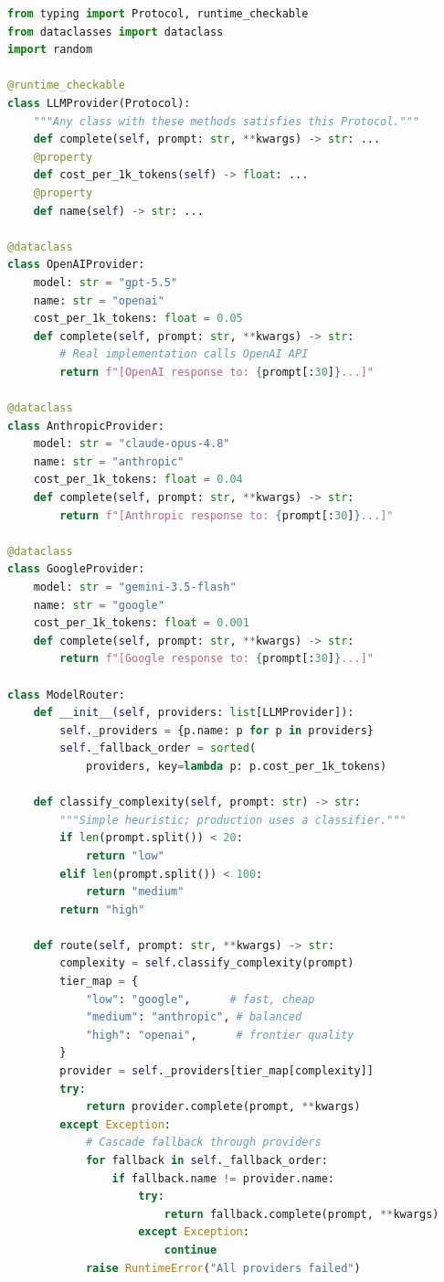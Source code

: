 \begin{lstlisting}[language=Python]
from typing import Protocol, runtime_checkable
from dataclasses import dataclass
import random

@runtime_checkable
class LLMProvider(Protocol):
    """Any class with these methods satisfies this Protocol."""
    def complete(self, prompt: str, **kwargs) -> str: ...
    @property
    def cost_per_1k_tokens(self) -> float: ...
    @property
    def name(self) -> str: ...

@dataclass
class OpenAIProvider:
    model: str = "gpt-5.5"
    name: str = "openai"
    cost_per_1k_tokens: float = 0.05
    def complete(self, prompt: str, **kwargs) -> str:
        # Real implementation calls OpenAI API
        return f"[OpenAI response to: {prompt[:30]}...]"

@dataclass
class AnthropicProvider:
    model: str = "claude-opus-4.8"
    name: str = "anthropic"
    cost_per_1k_tokens: float = 0.04
    def complete(self, prompt: str, **kwargs) -> str:
        return f"[Anthropic response to: {prompt[:30]}...]"

@dataclass
class GoogleProvider:
    model: str = "gemini-3.5-flash"
    name: str = "google"
    cost_per_1k_tokens: float = 0.001
    def complete(self, prompt: str, **kwargs) -> str:
        return f"[Google response to: {prompt[:30]}...]"

class ModelRouter:
    def __init__(self, providers: list[LLMProvider]):
        self._providers = {p.name: p for p in providers}
        self._fallback_order = sorted(
            providers, key=lambda p: p.cost_per_1k_tokens)

    def classify_complexity(self, prompt: str) -> str:
        """Simple heuristic; production uses a classifier."""
        if len(prompt.split()) < 20:
            return "low"
        elif len(prompt.split()) < 100:
            return "medium"
        return "high"

    def route(self, prompt: str, **kwargs) -> str:
        complexity = self.classify_complexity(prompt)
        tier_map = {
            "low": "google",      # fast, cheap
            "medium": "anthropic", # balanced
            "high": "openai",      # frontier quality
        }
        provider = self._providers[tier_map[complexity]]
        try:
            return provider.complete(prompt, **kwargs)
        except Exception:
            # Cascade fallback through providers
            for fallback in self._fallback_order:
                if fallback.name != provider.name:
                    try:
                        return fallback.complete(prompt, **kwargs)
                    except Exception:
                        continue
            raise RuntimeError("All providers failed")
\end{lstlisting}

